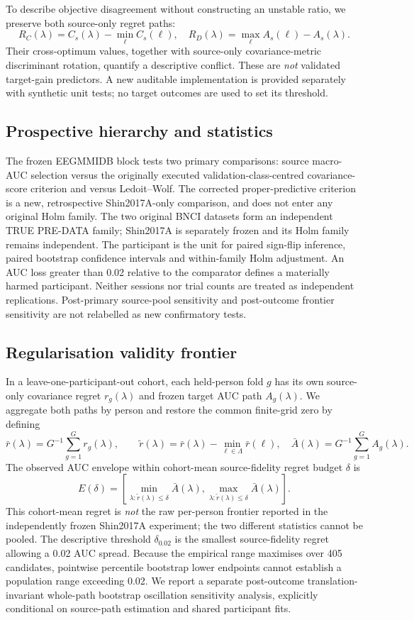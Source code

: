 \documentclass[11pt,a4paper]{article}
\begin{document}
To describe objective disagreement without constructing an unstable ratio,
we preserve both source-only regret paths:
\[
 R_C(\lambda)=C_s(\lambda)-\min_\ell C_s(\ell),\quad
 R_D(\lambda)=\max_\ell A_s(\ell)-A_s(\lambda).
\]
Their cross-optimum values, together with source-only covariance-metric
discriminant rotation, quantify a descriptive conflict.
These are \emph{not} validated target-gain predictors. A new auditable
implementation is provided separately with synthetic unit tests; no
target outcomes are used to set its threshold.

\subsection{Prospective hierarchy and statistics}
The frozen EEGMMIDB block tests two primary comparisons: source macro-AUC
selection versus the originally executed validation-class-centred
covariance-score criterion and versus Ledoit--Wolf. The corrected
proper-predictive criterion is a new, retrospective Shin2017A-only
comparison, and does not enter any original Holm family.
The two original BNCI datasets form an independent TRUE PRE-DATA family;
Shin2017A is separately frozen and its Holm family remains independent.
The participant is the unit for paired sign-flip inference, paired bootstrap
confidence intervals and within-family Holm adjustment. An AUC loss
greater than 0.02 relative to the comparator defines a materially harmed
participant. Neither sessions nor trial counts are treated as independent
replications. Post-primary source-pool sensitivity and post-outcome frontier
sensitivity are not relabelled as new confirmatory tests.



\subsection{Regularisation validity frontier}
In a leave-one-participant-out cohort, each held-person fold \(g\) has
its own source-only covariance regret \(r_g(\lambda)\) and frozen target
AUC path \(A_g(\lambda)\). We aggregate both paths by person and restore
the common finite-grid zero by defining
\[
 \bar r(\lambda)=G^{-1}\sum_{g=1}^{G}r_g(\lambda),\qquad
 \widetilde r(\lambda)=\bar r(\lambda)-\min_{\ell\in\Lambda}\bar r(\ell),
 \quad \bar A(\lambda)=G^{-1}\sum_{g=1}^{G}A_g(\lambda).
\]
The observed AUC envelope within cohort-mean source-fidelity
regret budget \(\delta\) is
\[
 E(\delta)=
 \left[
 \min_{\lambda:\widetilde r(\lambda)\le\delta}\bar A(\lambda),
 \max_{\lambda:\widetilde r(\lambda)\le\delta}\bar A(\lambda)
 \right].
\]
This cohort-mean regret is \emph{not} the raw per-person frontier
reported in the independently frozen Shin2017A experiment; the two
different statistics cannot be pooled.
The descriptive threshold \(\delta_{0.02}\) is the smallest source-fidelity
regret allowing a 0.02 AUC spread. Because the empirical range
maximises over 405 candidates, pointwise percentile bootstrap lower
endpoints cannot establish a population range exceeding 0.02. We report
a separate post-outcome translation-invariant whole-path bootstrap
oscillation sensitivity analysis, explicitly conditional on source-path
estimation and shared participant fits.
\end{document}
